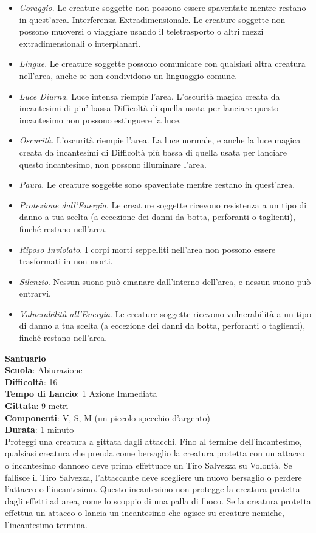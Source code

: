 \begin{multicols}{2}
\medskip
\begin{itemize}
\item
\textit{Coraggio}. Le creature soggette non possono essere spaventate mentre restano in quest'area. Interferenza Extradimensionale. Le creature soggette non possono muoversi o viaggiare usando il teletrasporto o altri mezzi extradimensionali o interplanari.
\item
\textit{Lingue}. Le creature soggette possono comunicare con qualsiasi altra creatura nell'area, anche se non condividono un linguaggio comune. 
\item
\textit{Luce Diurna}. Luce intensa riempie l'area. L'oscurità magica creata da incantesimi di piu' bassa Difficoltà di quella usata per lanciare questo incantesimo non possono estinguere la luce.
\item
\textit{Oscurità}. L'oscurità riempie l'area. La luce normale, e anche la luce magica creata da incantesimi di Difficoltà più bassa di quella usata per lanciare questo incantesimo, non possono illuminare l'area. 
\item
\textit{Paura}. Le creature soggette sono spaventate mentre restano in quest'area.
\item
\textit{Protezione dall'Energia}. Le creature soggette ricevono resistenza a un tipo di danno a tua scelta (a eccezione dei danni da botta, perforanti o taglienti), finché restano nell'area.
\item
\textit{Riposo Inviolato}. I corpi morti seppelliti nell'area non possono essere trasformati in non morti. 
\item
\textit{Silenzio}. Nessun suono può emanare dall'interno dell'area, e nessun suono può entrarvi.
\item
\textit{Vulnerabilità all'Energia}. Le creature soggette ricevono vulnerabilità a un tipo di danno a tua scelta (a eccezione dei danni da botta, perforanti o taglienti), finché restano nell'area.
\end{itemize}

\medskip\textbf{Santuario}\\
\textbf{Scuola}: Abiurazione\\
\textbf{Difficoltà}: 16\\
\textbf{Tempo di Lancio}: 1 Azione Immediata\\
\textbf{Gittata}: 9 metri\\
\textbf{Componenti}: V, S, M (un piccolo specchio d'argento)\\
\textbf{Durata}: 1 minuto\\
Proteggi una creatura a gittata dagli attacchi. Fino al termine dell'incantesimo, qualsiasi creatura che prenda come bersaglio la creatura protetta con un attacco o incantesimo dannoso deve prima effettuare un Tiro Salvezza su Volontà. Se fallisce il Tiro Salvezza, l'attaccante deve scegliere un nuovo bersaglio o perdere l'attacco o l'incantesimo. Questo incantesimo non protegge la creatura protetta dagli effetti ad area, come lo scoppio di una palla di fuoco. Se la creatura protetta effettua un attacco o lancia un incantesimo che agisce su creature nemiche, l'incantesimo termina.


\end{multicols}
